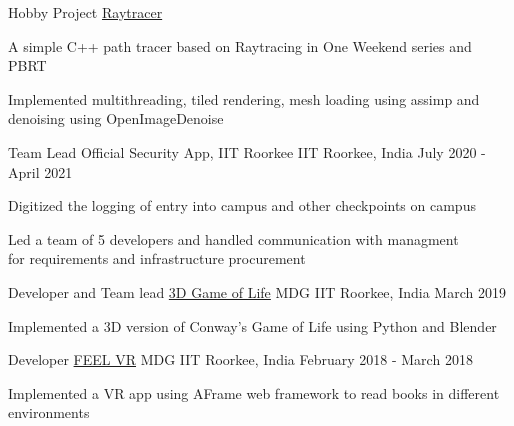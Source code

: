 \begin{cventries}
   \cventry
    {Hobby Project}
    {\href{https://github.com/KarthikRIyer/RayTracer}{Raytracer}}
    {}
    {}
    {
      \begin{cvitems}
      \item{A simple C++ path tracer based on Raytracing in One Weekend series and PBRT} 
      \item{Implemented multithreading, tiled rendering, mesh loading using assimp and denoising using OpenImageDenoise} 
      \end{cvitems}
    }
   \cventry
    {Team Lead}
    {Official Security App, IIT Roorkee}
    {IIT Roorkee, India}
    {July 2020 - April 2021}
    {
      \begin{cvitems}
        \item{Digitized the logging of entry into campus and other checkpoints on campus}
        \item{Led a team of 5 developers and handled communication with managment \\for requirements and infrastructure procurement}
      \end{cvitems}
    }
   \cventry
    {Developer and Team lead}
    {\href{https://github.com/am15h/Game-Of-Life-3D}{3D Game of Life}}
    {MDG IIT Roorkee, India}
    {March 2019}
    {
      \begin{cvitems}
      \item{Implemented a 3D version of Conway's Game of Life using Python and Blender}
      \end{cvitems}
    }
  \cventrylast
    {Developer}
    {\href{https://github.com/KarthikRIyer/FEEL-VR-Book-Reader}{FEEL VR}}
    {MDG IIT Roorkee, India}
    {February 2018 - March 2018}
    {
      \begin{cvitems}
        \item {Implemented a VR app using AFrame web framework to read books in different environments}
      \end{cvitems}
     }
\end{cventries}
